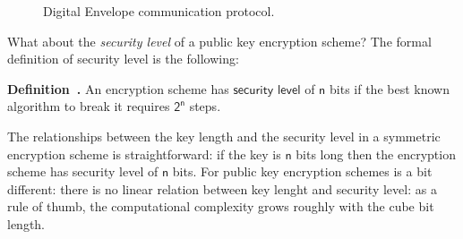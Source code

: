 \documentclass{article}
\newcounter{definition}[section]
\newenvironment{definition}[1][]{\refstepcounter{definition}\par\medskip
   \noindent \textbf{Definition~\thedefinition. #1} \rmfamily}{\medskip}
\begin{document}
\begin{figure}
    \centering
    \caption{Digital Envelope communication protocol.}
    \label{fig:digital_envelope_scheme}
\end{figure}

\par \noindent What about the \textit{security level} of a public key encryption scheme? The formal definition of security level is the following:

\begin{definition}
    An encryption scheme has $\mathsf{security}$ $\mathsf{level}$ of $\mathsf{n}$ bits if the best known algorithm to break it requires $\mathsf{2^n}$ steps.
\end{definition}

\par \noindent The relationships between the key length and the security level in a symmetric encryption scheme is straightforward: if the key is $\mathsf{n}$ bits long then the encryption scheme has security level of $\mathsf{n}$ bits. For public key encryption schemes is a bit different: there is no linear relation between key lenght and security level: as a rule of thumb, the computational complexity grows roughly with the cube bit length.
\end{document}
